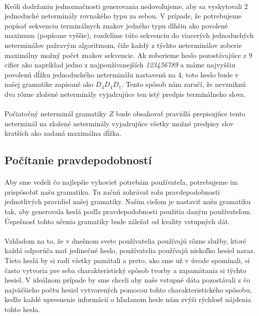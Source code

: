 \paragraph{}
Kvôli dodržaniu jednoznačnosti generovania nedovoľujeme, aby sa vyskytovali 2 jednoduché neterminály rovnakého typu za sebou. V prípade, že potrebujeme popísať sekvenciu terminálnych znakov jedného typu dlhšiu ako povolené maximum (popísane vyššie), rozdelíme túto sekvenciu do viacerých jednoduchých neterminálov pažravým algoritmom, čiže každý z týchto neterminálov zoberie maximálny možný počet znakov sekvencie. Ak zoberieme heslo pozostávajúce z 9 cifier ako napríklad jedno z najpoužívanejších \emph{123456789} a máme najvyššiu povolenú dĺžku jednoduchého neterminálu nastavenú na 4, toto heslo bude v našej gramatike zapísané ako \(D_4D_4D_1\). Tento spôsob nám zaručí, že nevzniknú dva rôzne zložené neterminály vyjadrujúce ten istý predpis terminálneho slova.

\paragraph{}
Počiatočný neterminál gramatiky \(Z\) bude obsahovať pravidlá prepisujúce tento neterminál na zložené neterminály vyjadrujúce všetky možné predpisy slov kratších ako zadaná maximálna dĺžka.

\subsection{Počítanie pravdepodobností}
\paragraph{}
Aby sme vedeli čo najlepšie vyhovieť potrebám používateľa, potrebujeme im prispôsobiť našu gramatiku. Tu začnú zohrávať rolu pravdepodobnosti jednotlivých pravidiel našej gramatiky. Našim cieľom je nastaviť našu gramatiku tak, aby generovala heslá podľa pravdepodobnosti použitia daným používateľom. Úspešnosť tohto učenia gramatiky bude záležať od kvality vstupných dát.
\paragraph{}
Vzhľadom na to, že v dnešnom svete používatelia používajú rôzne služby, ktoré každá odporúča mať jedinečné heslo, používatelia používajú niekoľko hesiel naraz. Tieto heslá by si radi všetky pamätali a preto, ako sme už v úvode spomínali, si často vytvoria pre seba charakteristický spôsob tvorby a zapamätania si týchto hesiel. V ideálnom prípade by sme chceli aby naše vstupné dáta pozostávali z čo najväčšieho počtu hesiel vytvorených pomocou tohto charakteristického spôsobu, keďže každé upresnenie informácií o hľadanom hesle nám zvýši rýchlosť nájdenia tohto hesla.
